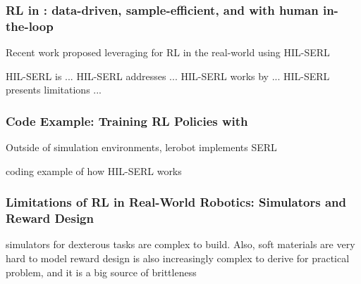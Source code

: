 \subsubsection{RL in \lerobot: data-driven, sample-efficient, and with human in-the-loop}
Recent work proposed leveraging for RL in the real-world using HIL-SERL

HIL-SERL is ...
HIL-SERL addresses ...
HIL-SERL works by ...
HIL-SERL presents limitations ...

\subsubsection{Code Example: Training RL Policies with \lerobot}
Outside of simulation environments, lerobot implements SERL

coding example of how HIL-SERL works

\subsubsection{Limitations of RL in Real-World Robotics: Simulators and Reward Design}
simulators for dexterous tasks are complex to build. Also, soft materials are very hard to model
reward design is also increasingly complex to derive for practical problem, and it is a big source of brittleness
